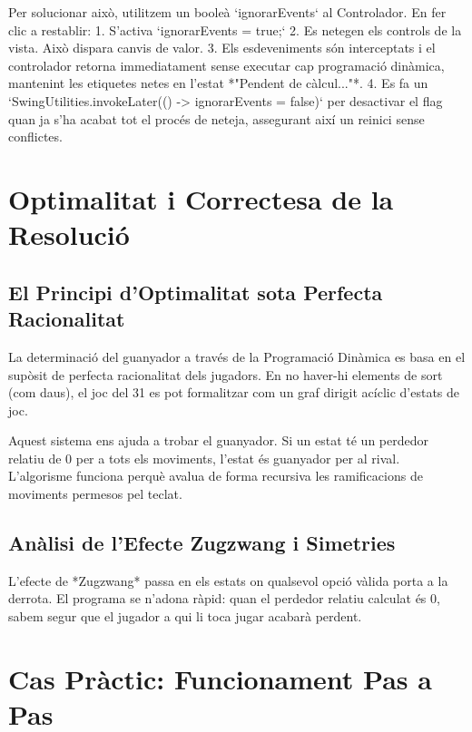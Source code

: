 \documentclass[compsoc, a4paper]{IEEEtran}
\begin{document}
Per solucionar això, utilitzem un booleà `ignorarEvents` al Controlador. En fer clic a restablir:
1. S'activa `ignorarEvents = true;`
2. Es netegen els controls de la vista. Això dispara canvis de valor.
3. Els esdeveniments són interceptats i el controlador retorna immediatament sense executar cap programació dinàmica, mantenint les etiquetes netes en l'estat *"Pendent de càlcul..."*.
4. Es fa un `SwingUtilities.invokeLater(() -> ignorarEvents = false)` per desactivar el flag quan ja s'ha acabat tot el procés de neteja, assegurant així un reinici sense conflictes.

\section{Optimalitat i Correctesa de la Resolució}

\subsection{El Principi d'Optimalitat sota Perfecta Racionalitat}

La determinació del guanyador a través de la Programació Dinàmica es basa en el supòsit de perfecta racionalitat dels jugadors. En no haver-hi elements de sort (com daus), el joc del 31 es pot formalitzar com un graf dirigit acíclic d'estats de joc. 

Aquest sistema ens ajuda a trobar el guanyador. Si un estat té un perdedor relatiu de $0$ per a tots els moviments, l'estat és guanyador per al rival. L'algorisme funciona perquè avalua de forma recursiva les ramificacions de moviments permesos pel teclat.

\subsection{Anàlisi de l'Efecte Zugzwang i Simetries}

L'efecte de *Zugzwang* passa en els estats on qualsevol opció vàlida porta a la derrota. El programa se n'adona ràpid: quan el perdedor relatiu calculat és $0$, sabem segur que el jugador a qui li toca jugar acabarà perdent.

\section{Cas Pràctic: Funcionament Pas a Pas}
\end{document}
